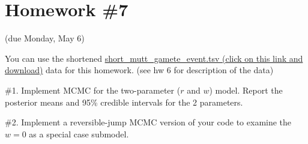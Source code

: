 \documentclass[11pt]{article}
\newcommand{\href}[2]{\url{#2}}
\begin{document}
\section*{Homework \#7} (due Monday, May 6)

You can use the shortened \href{https://github.com/mtholder/likelihood-methods-course-2019/raw/master/homework/short_mutt_gamete_event.tsv}{short_mutt_gamete_event.tsv (click on this link and download)} data for this
homework.
(see hw 6 for description of the data)



\#1. Implement MCMC for the two-parameter ($r$ and $w$) model. Report the posterior means and 95\% credible intervals for the 2 parameters.


\#2. Implement a reversible-jump MCMC version of your code to examine the $w=0$ as a special case submodel.
\end{document}
